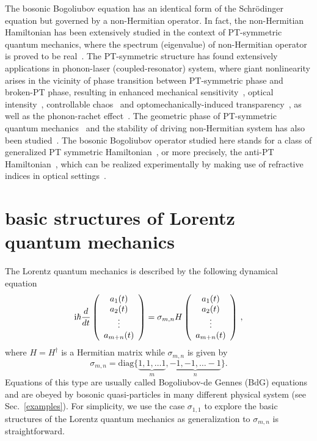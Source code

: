 \documentclass[pra,epsfig,rotate,superscriptaddress,showpacs]{revtex4}
\begin{document}
The bosonic Bogoliubov equation has an identical form of the Schr\"odinger equation but governed by a non-Hermitian operator. In fact, the non-Hermitian Hamiltonian has been extensively studied in the context of PT-symmetric quantum mechanics, where the spectrum (eigenvalue) of non-Hermitian operator is proved to be real~\cite{Bender}. The PT-symmetric structure has found extensively applications in phonon-laser (coupled-resonator) system, where giant nonlinearity arises in the vicinity of phase transition between PT-symmetric phase and broken-PT phase, resulting in enhanced mechanical sensitivity~\cite{J1}, optical intensity~\cite{J2}, controllable chaos~\cite{J3} and optomechanically-induced transparency~\cite{J4}, as well as the phonon-rachet effect~\cite{J5}. The geometric phase of PT-symmetric quantum mechanics~\cite{Gong1} and the stability of driving non-Hermitian system has also been studied~\cite{Gong2}. The bosonic Bogoliubov operator studied here stands for a class of generalized PT symmetric Hamiltonian~\cite{wang}, or more precisely, the anti-PT Hamiltonian~\cite{XiaoNP}, which
can be realized experimentally by making use of refractive indices in optical settings~\cite{XiaoNP,GOP}.


\section{basic structures of Lorentz quantum mechanics}
\label{basic}
The Lorentz quantum mechanics is described by the following dynamical equation
\begin{equation} \label{evolution2}
{\text i}\hbar\frac{d}{dt}\left(\begin{array}{c}a_1(t)\\a_2(t) \\ \vdots \\a_{m+n}(t)\end{array} \right)=\sigma_{m,n} H \left(\begin{array}{c}a_1(t)\\a_2(t) \\ \vdots \\a_{m+n}(t)\end{array} \right)\,,
\end{equation}
where $H=H^\dag$ is a Hermitian matrix while $\sigma_{m,n}$ is given by
\begin{equation}
\sigma_{m,n}= {\text {diag}} \{ \underbrace{1,1,\ldots 1}_{m}, \underbrace{-1,-1,\ldots -1}_{n}  \}.
\end{equation}
Equations of this type are usually called Bogoliubov-de Gennes (BdG) equations and are obeyed
by bosonic quasi-particles in many different physical system (see Sec.~\ref{examples}).
For simplicity, we use the case $\sigma_{1,1}$ to explore the basic structures of the Lorentz
quantum mechanics as generalization to $\sigma_{m,n}$ is straightforward.
\end{document}
